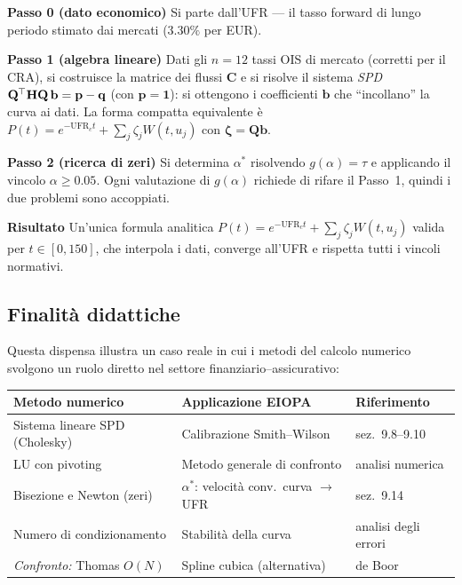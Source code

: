 \documentclass[11pt,a4paper]{article}
\theoremstyle{plain}
\theoremstyle{definition}
\theoremstyle{remark}
\newcommand{\UFR}{\ensuremath{\mathrm{UFR}}}
\newcommand{\bfzeta}{\bm{\zeta}}
\newcommand{\bfb}{\mathbf{b}}
\newcommand{\bfp}{\mathbf{p}}
\newcommand{\bfq}{\mathbf{q}}
\newcommand{\bfone}{\mathbf{1}}
\newcommand{\Hmat}{\mathbf{H}}
\newcommand{\Cmat}{\mathbf{C}}
\newcommand{\Qmat}{\mathbf{Q}}
\newcommand{\transp}{^{\mskip-1mu\top}}
\begin{document}
\begin{keybox}
\textbf{Passo 0 (dato economico)} Si parte dall'UFR --- il tasso forward di
lungo periodo stimato dai mercati ($3.30\%$ per EUR).

\textbf{Passo 1 (algebra lineare)} Dati gli $n=12$ tassi OIS di mercato
(corretti per il CRA), si costruisce la matrice dei flussi $\Cmat$ e si risolve il
sistema \emph{SPD} $\Qmat\transp\Hmat\Qmat\,\bfb = \bfp - \bfq$ (con $\bfp=\bfone$):
si ottengono i coefficienti $\bfb$ che ``incollano'' la curva ai dati. La forma
compatta equivalente è $P(t) = e^{-\UFR_c t} + \sum_j \zeta_j W(t,u_j)$ con
$\bfzeta = \Qmat\bfb$.

\textbf{Passo 2 (ricerca di zeri)} Si determina $\alpha^*$ risolvendo
$g(\alpha)=\tau$ e applicando il vincolo $\alpha\ge 0.05$. Ogni valutazione di
$g(\alpha)$ richiede di rifare il Passo~1, quindi i due problemi sono accoppiati.

\textbf{Risultato} Un'unica formula analitica $P(t) = e^{-\UFR_c t} +
\sum_j \zeta_j W(t,u_j)$ valida per $t \in [0,150]$, che interpola i dati,
converge all'UFR e rispetta tutti i vincoli normativi.
\end{keybox}

\subsection{Finalit\`a didattiche}

Questa dispensa illustra un caso reale in cui i metodi del calcolo numerico
svolgono un ruolo diretto nel settore finanziario--assicurativo:

\begin{center}
\renewcommand{\arraystretch}{1.3}
\begin{tabular}{lll}
\toprule
\textbf{Metodo numerico} & \textbf{Applicazione EIOPA} & \textbf{Riferimento}\\
\midrule
Sistema lineare SPD (Cholesky) & Calibrazione Smith--Wilson & sez.~9.8--9.10\\
LU con pivoting & Metodo generale di confronto & analisi numerica\\
Bisezione e Newton (zeri) & $\alpha^*$: velocità conv.\ curva $\to$ UFR & sez.~9.14\\
Numero di condizionamento & Stabilit\`a della curva & analisi degli errori\\
\emph{Confronto:} Thomas $O(N)$ & Spline cubica (alternativa) & de Boor~\cite{deBoor1978}\\
\bottomrule
\end{tabular}
\end{center}
\end{document}
